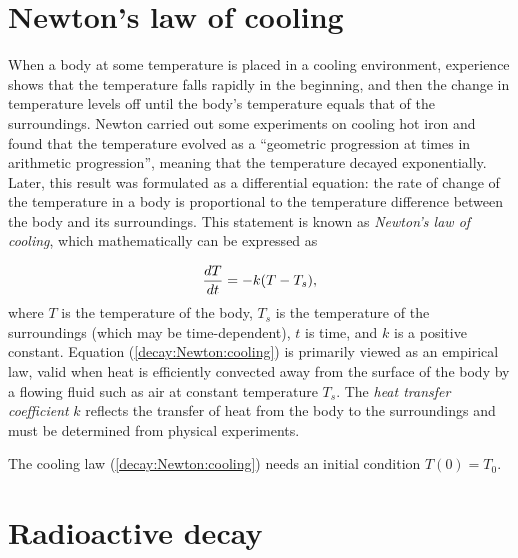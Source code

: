 \documentclass[graybox,sectrefs,envcountresetchap,open=right,final]{svmonodo}
\begin{document}
\section{Newton's law of cooling}
\label{decay:app:Newton:cooling}


When a body at some temperature is placed in a cooling environment,
experience shows that the temperature falls rapidly in the beginning,
and then the change in temperature levels off until the body's
temperature equals that of the surroundings. Newton carried out some
experiments on cooling hot iron and found that the temperature
evolved as a ``geometric progression at times in arithmetic progression'',
meaning that the temperature decayed exponentially.
Later, this result was formulated as a differential equation:
the rate of change of the temperature in a body is proportional to
the temperature difference between the body and its surroundings.
This statement is known as \emph{Newton's law of cooling}, which
mathematically can be expressed as

\begin{equation}
{dT\over dt} = -k(T-T_s),
\label{decay:Newton:cooling}
\end{equation}
where $T$ is the temperature of the body, $T_s$ is the temperature
of the surroundings (which may be time-dependent),
$t$ is time, and $k$ is a positive constant.
Equation (\ref{decay:Newton:cooling}) is primarily viewed as an
empirical law, valid when heat is efficiently convected away
from the surface of the body by a flowing fluid such as air
at constant temperature $T_s$.
The \emph{heat transfer coefficient} $k$ reflects the transfer of
heat from the body to
the surroundings and must be determined from physical experiments.

The cooling law (\ref{decay:Newton:cooling}) needs an initial
condition $T(0)=T_0$.

\section{Radioactive decay}
\label{decay:app:nuclear}
\end{document}
